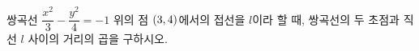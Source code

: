 쌍곡선 $\dfrac{x^2}{3}-\dfrac{y^2}{4}=-1$ 위의 점 $(3{,}\mkern3mu\mathopen{}4)$에서의 접선을 $l$이라 할 때, 쌍곡선의 두 초점과 직선 $l$ 사이의 거리의 곱을 구하시오.
